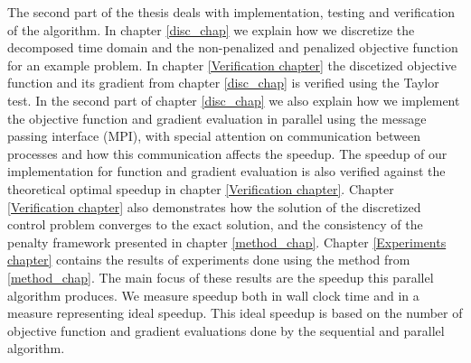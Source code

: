 The second part of the thesis deals with implementation, testing and verification of the algorithm. In chapter \ref{disc_chap} we explain how we discretize the decomposed time domain and the non-penalized and penalized objective function for an example problem. In chapter \ref{Verification chapter} the discetized objective function and its gradient from chapter \ref{disc_chap} is verified using the Taylor test. In the second part of chapter \ref{disc_chap} we also explain how we implement the objective function and gradient evaluation in parallel using the message passing interface (MPI), with special attention on communication between processes and how this communication affects the speedup. The speedup of our implementation for function and gradient evaluation is also verified against the theoretical optimal speedup in chapter \ref{Verification chapter}. Chapter \ref{Verification chapter} also demonstrates how the solution of the discretized control problem converges to the exact solution, and the consistency of the penalty framework presented in chapter \ref{method_chap}. Chapter \ref{Experiments chapter} contains the results of experiments done using the method from \ref{method_chap}. The main focus of these results are the speedup this parallel algorithm produces. We measure speedup both in wall clock time and in a measure representing ideal speedup. This ideal speedup is based on the number of objective function and gradient evaluations done by the sequential and parallel algorithm.
